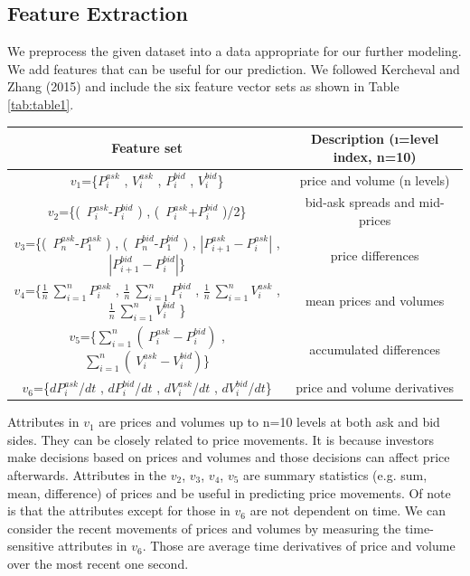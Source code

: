 \documentclass[11pt]{article}
\begin{document}
\subsection{Feature Extraction}
We preprocess the given dataset into a data appropriate for our further modeling. We add features that can be useful for our prediction. We followed Kercheval and Zhang (2015) \cite{2015finance} and include the six feature vector sets as shown in Table \ref{tab:table1}. 

\begin{center}
   \label{tab:table1} 
  \begin{tabular}{|c | c |} 
    \hline
    Feature set & Description (\i=level index, n=10)\\
    \hline
    $v_{1}$=\{$P_{i}^{ask}$ , $V_{i}^{ask}$ , $P_{i}^{bid}$ , $V_{i}^{bid}$\} & price and volume (n levels)\\ 
    \hline
    $v_{2}$=\{(\ $P_{i}^{ask}$-$P_{i}^{bid}$ ) , (\ $P_{i}^{ask}$+$P_{i}^{bid}$ )/2\} & bid-ask spreads and mid-prices\\
    \hline
    $v_{3}$=\{(\ $P_{n}^{ask}$-$P_{1}^{ask}$ ) , (\ $P_{n}^{bid}$-$P_{1}^{bid}$ ) , $| P_{i+1}^{ask} - P_{i}^{ask} |$ , $| P_{i+1}^{bid} - P_{i}^{bid} |$\} & price differences \\
    \hline
    $v_{4}$=\{$\frac{1}{n}\ \sum_{i=1}^{n} P_{i}^{ask}$ , $\frac{1}{n}\ \sum_{i=1}^{n} P_{i}^{bid}$ , $\frac{1}{n}\ \sum_{i=1}^{n} V_{i}^{ask}$ , $\frac{1}{n}\ \sum_{i=1}^{n} V_{i}^{bid}$ \} & mean prices and volumes \\
    \hline
    $v_{5}$=\{$\sum_{i=1}^{n} (\ P_{i}^{ask}-P_{i}^{bid} )$ , $\sum_{i=1}^{n} (\ V_{i}^{ask}-V_{i}^{bid} )$\} & accumulated differences \\
    \hline
    $v_{6}$=\{$d P_{i}^{ask}$/$dt$ , $d P_{i}^{bid}$/$dt$ , $d V_{i}^{ask}$/$dt$ , $d V_{i}^{bid}$/$dt$\} & price and volume derivatives \\
    \hline
  \end{tabular}
\end{center}

Attributes in $v_{1}$ are prices and volumes up to n=10 levels at both ask and bid sides. They can be closely related to price movements. It is because investors make decisions based on prices and volumes and those decisions can affect price afterwards. Attributes in the $v_{2}$, $v_{3}$, $v_{4}$, $v_{5}$ are summary statistics (e.g. sum, mean, difference) of prices and be useful in predicting price movements. Of note is that the attributes except for those in $v_{6}$ are not dependent on time. We can consider the recent movements of prices and volumes by measuring the time-sensitive attributes in $v_{6}$. Those are average time derivatives of price and volume over the most recent one second. 
\end{document}
